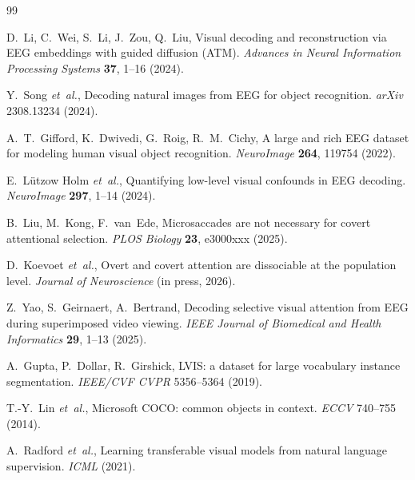 \documentclass[12pt]{article}
\begin{document}
%   
%   
\begin{thebibliography}{99}

D.~Li, C.~Wei, S.~Li, J.~Zou, Q.~Liu, Visual decoding and reconstruction
via {EEG} embeddings with guided diffusion ({ATM}). \textit{Advances in
Neural Information Processing Systems} \textbf{37}, 1--16 (2024).

Y.~Song \textit{et~al.}, Decoding natural images from {EEG} for object
recognition. \textit{arXiv} 2308.13234 (2024).

A.~T.~Gifford, K.~Dwivedi, G.~Roig, R.~M.~Cichy, A large and rich {EEG}
dataset for modeling human visual object recognition. \textit{NeuroImage}
\textbf{264}, 119754 (2022).

E.~L\"{u}tzow Holm \textit{et~al.}, Quantifying low-level visual
confounds in {EEG} decoding. \textit{NeuroImage} \textbf{297}, 1--14 (2024).

B.~Liu, M.~Kong, F.~van~Ede, Microsaccades are not necessary for covert
attentional selection. \textit{PLOS Biology} \textbf{23}, e3000xxx (2025).

D.~Koevoet \textit{et~al.}, Overt and covert attention are dissociable at
the population level. \textit{Journal of Neuroscience} (in press, 2026).

Z.~Yao, S.~Geirnaert, A.~Bertrand, Decoding selective visual attention
from {EEG} during superimposed video viewing. \textit{IEEE Journal of
Biomedical and Health Informatics} \textbf{29}, 1--13 (2025).

A.~Gupta, P.~Dollar, R.~Girshick, {LVIS}: a dataset for large vocabulary
instance segmentation. \textit{IEEE/CVF CVPR} 5356--5364 (2019).

T.-Y.~Lin \textit{et~al.}, Microsoft {COCO}: common objects in context.
\textit{ECCV} 740--755 (2014).

A.~Radford \textit{et~al.}, Learning transferable visual models from
natural language supervision. \textit{ICML} (2021).


\end{thebibliography}
\end{document}
